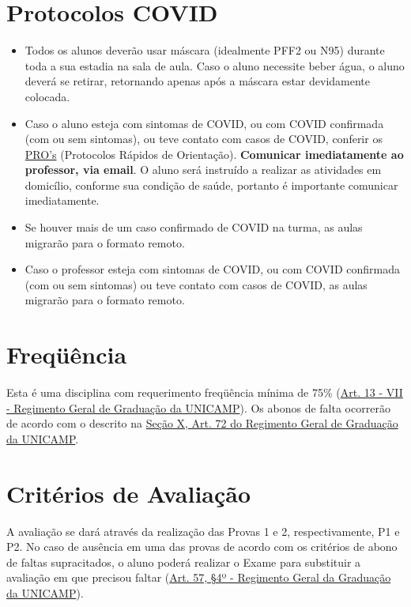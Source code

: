 \documentclass[paper=letter, fontsize=12pt]{scrartcl} %
\begin{document}
\section{Protocolos COVID}

\begin{itemize}

\item Todos os alunos deverão usar máscara (idealmente PFF2 ou N95) durante toda a sua estadia na sala de aula. Caso o aluno necessite beber água, o aluno deverá se retirar, retornando apenas após a máscara estar devidamente colocada.

\item Caso o aluno esteja com sintomas de COVID, ou com COVID confirmada (com ou sem sintomas), ou teve contato com casos de COVID, conferir os \href{https://www.ime.unicamp.br/retomada/pros.html}{PRO's} (Protocolos Rápidos de Orientação). \textbf{Comunicar imediatamente ao professor, via email}. O aluno será instruído a realizar as atividades em domicílio, conforme sua condição de saúde, portanto é importante comunicar imediatamente.

\item Se houver mais de um caso confirmado de COVID na turma, as aulas migrarão para o formato remoto.

\item Caso o professor esteja com sintomas de COVID, ou com COVID confirmada (com ou sem sintomas) ou teve contato com casos de COVID, as aulas migrarão para o formato remoto.

\end{itemize}

\section{Freqüência}

Esta é uma disciplina com requerimento freqüência mínima de 75\% (\href{https://www.dac.unicamp.br/portal/graduacao/regimento-geral}{Art. 13 - VII - Regimento Geral de Graduação da UNICAMP}). Os abonos de falta ocorrerão de acordo com o descrito na \href{https://www.dac.unicamp.br/portal/graduacao/regimento-geral}{Seção X, Art. 72 do Regimento Geral de Graduação da UNICAMP}.

\section{Critérios de Avaliação}

A avaliação se dará através da realização das Provas 1 e 2, respectivamente, P1 e P2. No caso de ausência em uma das provas de acordo com os critérios de abono de faltas supracitados, o aluno poderá realizar o Exame para substituir a avaliação em que precisou faltar (\href{https://www.dac.unicamp.br/portal/graduacao/regimento-geral}{Art. 57, §4º - Regimento Geral da Graduação da UNICAMP}).
\end{document}
